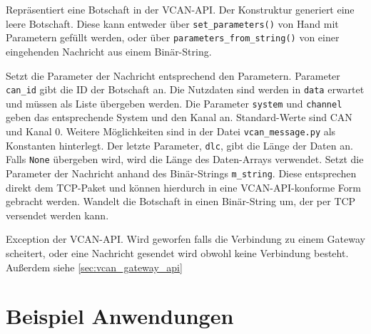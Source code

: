 \begin{description}
    Repräsentiert eine Botschaft in der VCAN-API. Der Konstruktur generiert eine leere Botschaft. Diese kann entweder über \texttt{set\_parameters()} von Hand mit Parametern gefüllt werden, oder über \texttt{parameters\_from\_string()} von einer eingehenden Nachricht aus einem Binär-String.
    \begin{description}
        Setzt die Parameter der Nachricht entsprechend den Parametern. Parameter \texttt{can\_id} gibt die ID der Botschaft an. Die Nutzdaten sind werden in \texttt{data} erwartet und müssen als Liste übergeben werden. Die Parameter \texttt{system} und \texttt{channel} geben das entsprechende System und den Kanal an. Standard-Werte sind CAN und Kanal 0. Weitere Möglichkeiten sind in der Datei \texttt{vcan\_message.py} als Konstanten hinterlegt. Der letzte Parameter, \texttt{dlc}, gibt die Länge der Daten an. Falls \texttt{None} übergeben wird, wird die Länge des Daten-Arrays verwendet.
        Setzt die Parameter der Nachricht anhand des Binär-Strings \texttt{m\_string}. Diese entsprechen direkt dem TCP-Paket und können hierdurch in eine VCAN-API-konforme Form gebracht werden.
        Wandelt die Botschaft in einen Binär-String um, der per TCP versendet werden kann.
    \end{description}
\end{description}

\begin{description}
    Exception der VCAN-API. Wird geworfen falls die Verbindung zu einem Gateway scheitert, oder eine Nachricht gesendet wird obwohl keine Verbindung besteht. Außerdem siehe \ref{sec:vcan_gateway_api}
\end{description}




\section{Beispiel Anwendungen}
\label{sec:vcan_beispiele}















